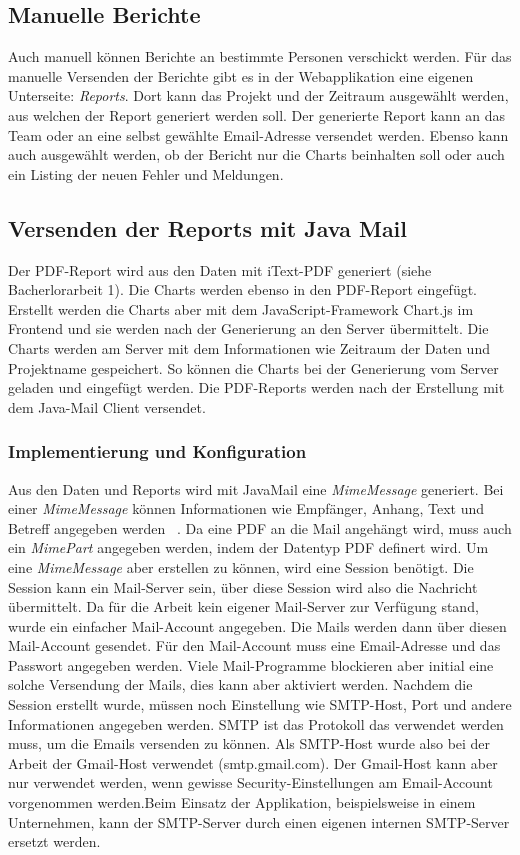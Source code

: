 \subsection{Manuelle Berichte}
Auch manuell können Berichte an bestimmte Personen verschickt werden. Für das manuelle Versenden der Berichte gibt es in der Webapplikation eine eigenen Unterseite: \textit{Reports}. Dort kann das Projekt und der Zeitraum ausgewählt werden, aus welchen der Report generiert werden soll. Der generierte Report kann an das Team oder an eine selbst gewählte Email-Adresse versendet werden. Ebenso kann auch ausgewählt werden, ob der Bericht nur die Charts beinhalten soll oder auch ein Listing der neuen Fehler und Meldungen.
\subsection{Versenden der Reports mit Java Mail}
Der PDF-Report wird aus den Daten mit iText-PDF generiert (siehe Bacherlorarbeit 1). Die Charts werden ebenso in den PDF-Report eingefügt. Erstellt werden die Charts aber mit dem JavaScript-Framework Chart.js im Frontend und sie werden nach der Generierung an den Server übermittelt. Die Charts werden am Server mit dem Informationen wie Zeitraum der Daten und Projektname gespeichert. So können die Charts bei der Generierung vom Server geladen und eingefügt werden. Die PDF-Reports werden nach der Erstellung mit dem Java-Mail Client versendet. 
\subsubsection{Implementierung und Konfiguration} 
Aus den Daten und Reports wird mit JavaMail eine \textit{MimeMessage} generiert. Bei einer \textit{MimeMessage} können Informationen wie Empfänger, Anhang, Text und Betreff angegeben werden ~\parencite{harold2013javamail}. Da eine PDF an die Mail angehängt wird, muss auch ein \textit{MimePart} angegeben werden, indem der Datentyp PDF definert wird. Um eine \textit{MimeMessage} aber erstellen zu können, wird eine Session benötigt. Die Session kann ein Mail-Server sein, über diese Session wird also die Nachricht übermittelt. Da für die Arbeit kein eigener Mail-Server zur Verfügung stand, wurde ein einfacher Mail-Account angegeben. Die Mails werden dann über diesen Mail-Account gesendet. Für den Mail-Account muss eine Email-Adresse und das Passwort angegeben werden. Viele Mail-Programme blockieren aber initial eine solche Versendung der Mails, dies kann aber aktiviert werden. Nachdem die Session erstellt wurde, müssen noch Einstellung wie SMTP-Host, Port und andere Informationen angegeben werden. SMTP ist das Protokoll das verwendet werden muss, um die Emails versenden zu können. Als SMTP-Host wurde also bei der Arbeit der Gmail-Host verwendet (smtp.gmail.com). Der Gmail-Host kann aber nur verwendet werden, wenn gewisse Security-Einstellungen am Email-Account vorgenommen werden.Beim Einsatz der Applikation, beispielsweise in einem Unternehmen, kann der SMTP-Server durch einen eigenen internen SMTP-Server ersetzt werden.
